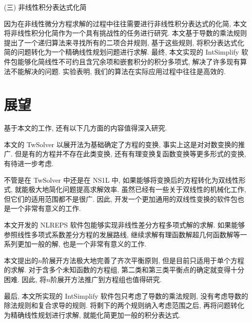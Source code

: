 (三) 非线性积分表达式化简

因为在非线性微分方程求解的过程中往往需要进行非线性积分表达式的化简, 本文将非线性积分化简作为一个具有挑战性的任务进行研究. 本文基于导数的乘法规则提出了一个递归算法来寻找所有的二项合并规则, 基于这些规则, 将积分表达式化简的问题转化为一个精确线性规划问题进行求解. 最终, 本文实现的 IntSimplify 软件包能够化简线性不可约且含冗余项和嵌套积分的积分多项式, 解决了许多现有算法不能解决的问题. 实验表明, 我们的算法在实际应用过程中往往是高效的. 

\section{展望}
基于本文的工作, 还有以下几方面的内容值得深入研究.
\begin{compactenum}[(1)]
\item 本文的 TwSolver 以\Painleve{}展开法为基础确定了方程的变换, 事实上这是对对数变换的推广. 但是有的方程并不存在此类变换, 还有有理变换\D 复函数变换等更多形式的变换, 有待进一步考虑.
\item 不管是在 TwSolver 中还是在 NS1L 中, 如果能够将变换后的方程转化为双线性形式, 就能极大地简化问题\D 提高求解效率. 虽然已经有一些关于双线性的机械化工作, 但它们的适用范围都不是很广. 因此, 开发一个更加通用的双线性变换的软件包也是一个非常有意义的工作.
\item 本文开发的 NLREPS 软件包能够实现非线性差分方程多项式解的求解. 如果能够参照线性多项式系数差分方程的发展路线, 继续求解有理函数解\D 超几何函数解等一系列更加一般的解, 也是一个非常有意义的工作. 
\item 本文提出的$n$阶展开方法极大地完善了齐次平衡原则, 但是目前只适用于单个方程的求解. 对于含多个未知函数的方程组, 第二类和第三类平衡点的确定就变得十分困难. 因此, 将$n$阶展开方法推广到方程组也值得研究.
\item 最后, 本文所实现的 IntSimplify 软件包只考虑了导数的乘法规则, 没有考虑导数的除法规则和复合求导的规则. 将剩下的两个规则纳入考虑范围之后, 再将问题转化为精确线性规划进行求解, 就能化简更加一般的积分表达式. 
\end{compactenum}
